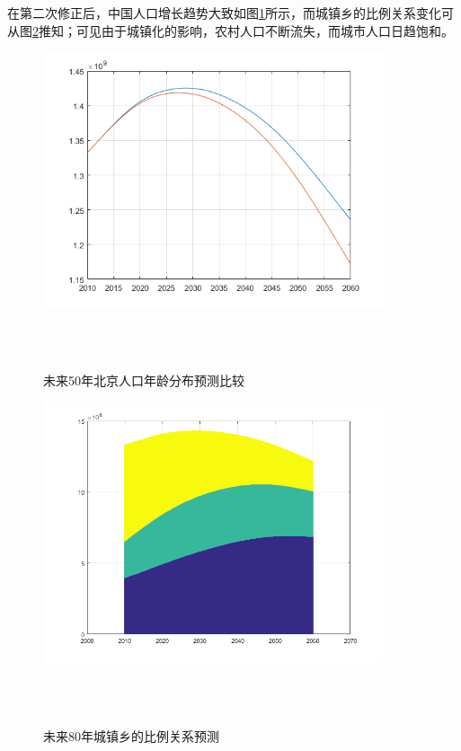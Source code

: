 \documentclass[a4paper]{article}
\begin{document}
\indent
\\\\
在第二次修正后，中国人口增长趋势大致如图\ref{amend_2_3}所示，而城镇乡的比例关系变化可从图\ref{amend_5}推知；可见由于城镇化的影响，农村人口不断流失，而城市人口日趋饱和。\\
	\begin{figure}
		\centering
		\includegraphics[width=10cm]{pics/amend_3.png}
		\caption{未来50年北京人口年龄分布预测比较}
		 \\
		 \\
		\label{amend_2_3}
	\end{figure}
	\begin{figure}
		\centering
		\includegraphics[width=10cm]{pics/amend_5.png}
		\caption{未来80年城镇乡的比例关系预测}
		 \\
		 	\\
		\label{amend_5}
	\end{figure}
\end{document}

